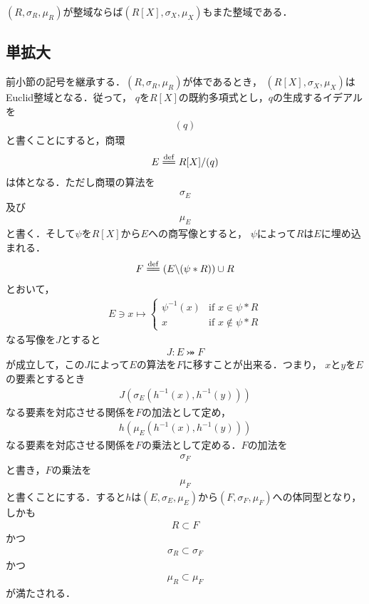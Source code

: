 	$(R,\sigma_R,\mu_R)$が整域ならば$(R[X],\sigma_X,\mu_X)$もまた整域である．

\subsection{単拡大}
	前小節の記号を継承する．$(R,\sigma_R,\mu_R)$が体であるとき，
	$(R[X],\sigma_X,\mu_X)$はEuclid整域となる．従って，
	$q$を$R[X]$の既約多項式とし，$q$の生成するイデアルを
	\begin{align}
		(q)
	\end{align}
	と書くことにすると，商環
	\begin{align}
		E \defeq R[X]/(q)
	\end{align}
	は体となる．ただし商環の算法を
	\begin{align}
		\sigma_E
	\end{align}
	及び
	\begin{align}
		\mu_E
	\end{align}
	と書く．そして$\psi$を$R[X]$から$E$への商写像とすると，
	$\psi$によって$R$は$E$に埋め込まれる．
	\begin{align}
		F \defeq \left(E \backslash (\psi \ast R)\right) \cup R
	\end{align}
	とおいて，
	\begin{align}
		E \ni x \longmapsto
		\begin{cases}
			\psi^{-1}(x) & \mbox{if } x \in \psi \ast R \\
			x & \mbox{if } x \notin \psi \ast R
		\end{cases}
	\end{align}
	なる写像を$J$とすると
	\begin{align}
		J:E \bij F
	\end{align}
	が成立して，この$J$によって$E$の算法を$F$に移すことが出来る．つまり，
	$x$と$y$を$E$の要素とするとき
	\begin{align}
		J\left( \sigma_E\left(h^{-1}(x),h^{-1}(y)\right) \right)
	\end{align}
	なる要素を対応させる関係を$F$の加法として定め，
	\begin{align}
		h\left( \mu_E\left(h^{-1}(x),h^{-1}(y)\right) \right)
	\end{align}
	なる要素を対応させる関係を$F$の乗法として定める．$F$の加法を
	\begin{align}
		\sigma_F
	\end{align}
	と書き，$F$の乗法を
	\begin{align}
		\mu_F
	\end{align}
	と書くことにする．すると$h$は$(E,\sigma_E,\mu_E)$から$(F,\sigma_F,\mu_F)$への体同型となり，しかも
	\begin{align}
		R \subset F
	\end{align}
	かつ
	\begin{align}
		\sigma_R \subset \sigma_F
	\end{align}
	かつ
	\begin{align}
		\mu_R \subset \mu_F
	\end{align}
	が満たされる．
	
